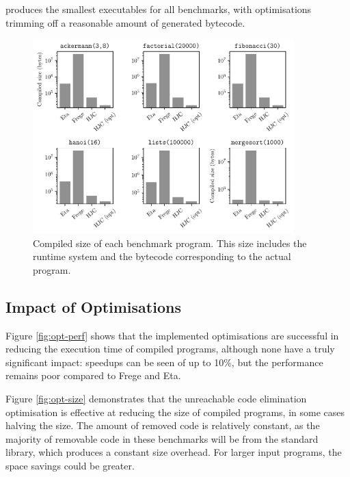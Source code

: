 \documentclass[dissertation.tex]{subfiles}
\begin{document}
{{        \compilername produces the smallest executables for all benchmarks, with optimisations trimming off a reasonable amount of generated bytecode.

        \begin{figure}[H]
            \centering
            \captionsetup{width=0.8\textwidth}
            \includegraphics[width=0.9\textwidth]{graphs/size.pdf}
            \caption{Compiled size of each benchmark program. This size includes the runtime system and the bytecode corresponding to the actual program.}
            \label{fig:executable-size}
        \end{figure}
    }
    \subsection{Impact of Optimisations}
    {
        Figure \ref{fig:opt-perf} shows that the implemented optimisations are successful in reducing the execution time of compiled programs, although none have a truly significant impact: speedups can be seen of up to 10\%, but the performance remains poor compared to Frege and Eta.

        Figure \ref{fig:opt-size} demonstrates that the unreachable code elimination optimisation is effective at reducing the size of compiled programs, in some cases halving the size. The amount of removed code is relatively constant, as the majority of removable code in these benchmarks will be from the standard library, which produces a constant size overhead. For larger input programs, the space savings could be greater.

}}
\end{document}
